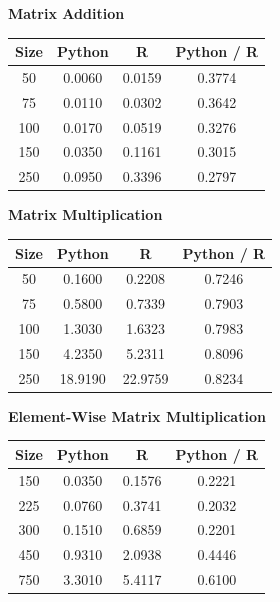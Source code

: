 \documentclass[%
  final,
  notitlepage,
  narroweqnarray,
  inline,
]{ieee}
\begin{document}
\begin{table}[h!]
  \scriptsize
  \begin{center}
    \vspace{1em}
    \textbf{Matrix Addition} \\
    \begin{tabular}{cccc}
      Size  & Python  &  R      & Python / R \\
      \hline
      50  & 0.0060 & 0.0159 & 0.3774 \\
      75  & 0.0110 & 0.0302 & 0.3642 \\
      100 & 0.0170 & 0.0519 & 0.3276 \\
      150 & 0.0350 & 0.1161 & 0.3015 \\
      250 & 0.0950 & 0.3396 & 0.2797 \\
    \end{tabular}

    \vspace{1em}
    \textbf{Matrix Multiplication} \\
    \begin{tabular}{cccc}
      Size  & Python  &  R    & Python / R \\
      \hline
      50  & 0.1600  & 0.2208  & 0.7246 \\
      75  & 0.5800  & 0.7339  & 0.7903 \\
      100 & 1.3030  & 1.6323  & 0.7983 \\
      150 & 4.2350  & 5.2311  & 0.8096 \\
      250 & 18.9190 & 22.9759 & 0.8234 \\
    \end{tabular}

    \vspace{1em}
    \textbf{Element-Wise Matrix Multiplication} \\
    \begin{tabular}{cccc}
      Size  & Python  &  R       & Python / R \\
      \hline
      150   & 0.0350  &  0.1576  &  0.2221 \\
      225   & 0.0760  &  0.3741  &  0.2032 \\
      300   & 0.1510  &  0.6859  &  0.2201 \\
      450   & 0.9310  &  2.0938  &  0.4446 \\
      750   & 3.3010  &  5.4117  &  0.6100 \\
    \end{tabular}


\end{center}
\end{table}
\end{document}
